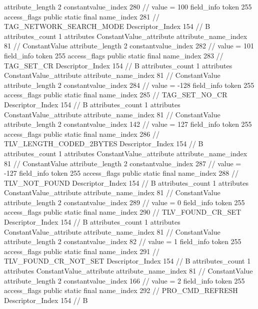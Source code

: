 {{{{{{{					attribute_length	2
					constantvalue_index	280		// value = 100
				}
				}
			}
			field_info {
				token	255
				access_flags	public static final
				name_index	281		// TAG_NETWORK_SEARCH_MODE
				Descriptor_Index	154		// B
				attributes_count	1
				attributes {
				ConstantValue_attribute {
					attribute_name_index	81		// ConstantValue
					attribute_length	2
					constantvalue_index	282		// value = 101
				}
				}
			}
			field_info {
				token	255
				access_flags	public static final
				name_index	283		// TAG_SET_CR
				Descriptor_Index	154		// B
				attributes_count	1
				attributes {
				ConstantValue_attribute {
					attribute_name_index	81		// ConstantValue
					attribute_length	2
					constantvalue_index	284		// value = -128
				}
				}
			}
			field_info {
				token	255
				access_flags	public static final
				name_index	285		// TAG_SET_NO_CR
				Descriptor_Index	154		// B
				attributes_count	1
				attributes {
				ConstantValue_attribute {
					attribute_name_index	81		// ConstantValue
					attribute_length	2
					constantvalue_index	142		// value = 127
				}
				}
			}
			field_info {
				token	255
				access_flags	public static final
				name_index	286		// TLV_LENGTH_CODED_2BYTES
				Descriptor_Index	154		// B
				attributes_count	1
				attributes {
				ConstantValue_attribute {
					attribute_name_index	81		// ConstantValue
					attribute_length	2
					constantvalue_index	287		// value = -127
				}
				}
			}
			field_info {
				token	255
				access_flags	public static final
				name_index	288		// TLV_NOT_FOUND
				Descriptor_Index	154		// B
				attributes_count	1
				attributes {
				ConstantValue_attribute {
					attribute_name_index	81		// ConstantValue
					attribute_length	2
					constantvalue_index	289		// value = 0
				}
				}
			}
			field_info {
				token	255
				access_flags	public static final
				name_index	290		// TLV_FOUND_CR_SET
				Descriptor_Index	154		// B
				attributes_count	1
				attributes {
				ConstantValue_attribute {
					attribute_name_index	81		// ConstantValue
					attribute_length	2
					constantvalue_index	82		// value = 1
				}
				}
			}
			field_info {
				token	255
				access_flags	public static final
				name_index	291		// TLV_FOUND_CR_NOT_SET
				Descriptor_Index	154		// B
				attributes_count	1
				attributes {
				ConstantValue_attribute {
					attribute_name_index	81		// ConstantValue
					attribute_length	2
					constantvalue_index	166		// value = 2
				}
				}
			}
			field_info {
				token	255
				access_flags	public static final
				name_index	292		// PRO_CMD_REFRESH
				Descriptor_Index	154		// B
}}}}}
